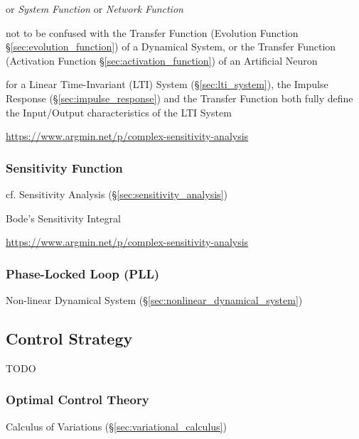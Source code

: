 or \emph{System Function} or \emph{Network Function}

not to be confused with the Transfer Function (Evolution Function
\S\ref{sec:evolution_function}) of a Dynamical System, or the Transfer Function
(Activation Function \S\ref{sec:activation_function}) of an Artificial Neuron

for a Linear Time-Invariant (LTI) System (\S\ref{sec:lti_system}), the Impulse
Response (\S\ref{sec:impulse_response}) and the Transfer Function both fully
define the Input/Output characteristics of the LTI System

\url{https://www.argmin.net/p/complex-sensitivity-analysis}



\subsubsection{Sensitivity Function}\label{sec:sensitivity_function}

cf. Sensitivity Analysis (\S\ref{sec:sensitivity_analysis})

Bode's Sensitivity Integral

\url{https://www.argmin.net/p/complex-sensitivity-analysis}



\subsubsection{Phase-Locked Loop (PLL)}\label{sec:pll}

Non-linear Dynamical System (\S\ref{sec:nonlinear_dynamical_system})



\subsection{Control Strategy}\label{sec:control_strategy}

TODO



\subsubsection{Optimal Control Theory}\label{sec:optimal_control}

\fist Calculus of Variations (\S\ref{sec:variational_calculus})

